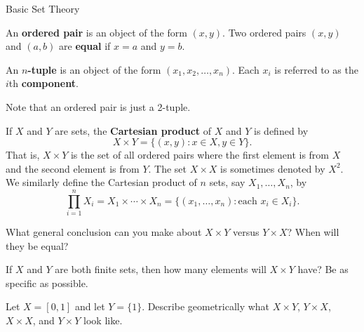 \begin{section}{Basic Set Theory}
\begin{definition}
An \textbf{ordered pair} is an object of the form \((x,y)\). Two ordered pairs \((x,y)\) and \((a,b)\) are \textbf{equal} if \(x=a\) and \(y=b\). 
\end{definition}

\begin{definition}
An \textbf{\(n\)-tuple} is an object of the form \((x_1, x_2,\ldots,x_n)\).  Each \(x_i\) is referred to as the \(i\)th \textbf{component}.
\end{definition}

Note that an ordered pair is just a 2-tuple.

\begin{definition}\label{def:cartesian_product}
If \(X\) and \(Y\) are sets, the \textbf{Cartesian product} of \(X\) and \(Y\) is defined by
\[
X\times Y=\{(x,y): x\in X, y\in Y\}.
\]
That is, \(X\times Y\) is the set of all ordered pairs where the first element is from \(X\) and the second element is from \(Y\).  The set \(X\times X\) is sometimes denoted by \(X^2\).  We similarly define the Cartesian product of \(n\) sets, say \(X_1, \ldots, X_n\), by
\[
\prod_{i=1}^{n} X_i=X_1\times \cdots \times X_n=\{(x_1,\ldots,x_n): \mbox{each } x_i\in X_i\}.
\]
\end{definition}

\begin{exercise}
What general conclusion can you make about \(X\times Y\) versus \(Y\times X\)?  When will they be equal?
\end{exercise}

\begin{exercise}
If \(X\) and \(Y\) are both finite sets, then how many elements will \(X\times Y\) have?  Be as specific as possible.
\end{exercise}

\begin{exercise}
Let \(X=[0,1]\) and let \(Y=\{1\}\).  Describe geometrically what \(X\times Y\), \(Y\times X\), \(X\times X\), and \(Y\times Y\) look like.
\end{exercise}

\end{section}

